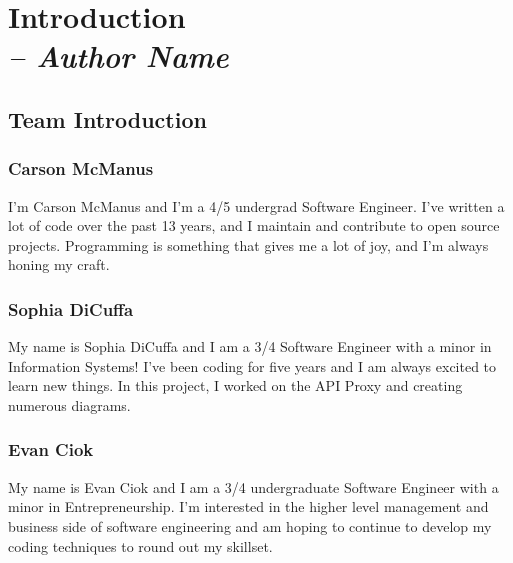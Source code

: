 \chapter{Introduction \\
  \small{\textit{-- Author Name}}
  \label{Chapter::Introduction}}

\section{Team Introduction \label{Section::TeamIntroduction}}

\subsection{Carson McManus}

I'm Carson McManus and I'm a 4/5 undergrad Software Engineer. I've written a lot of code over the past 13 years, and I maintain and contribute to open source projects. Programming is something that gives me a lot of joy, and I'm always honing my craft.

\subsection{Sophia DiCuffa}

My name is Sophia DiCuffa and I am a 3/4 Software Engineer with a minor in Information Systems! I've been coding for five years and I am always excited to learn new things.
In this project, I worked on the API Proxy and creating numerous diagrams.

\subsection{Evan Ciok}

My name is Evan Ciok and I am a 3/4 undergraduate Software Engineer with a minor in Entrepreneurship. I'm interested in the higher level management and business side of software engineering and am hoping to continue to develop my coding techniques to round out my skillset. 